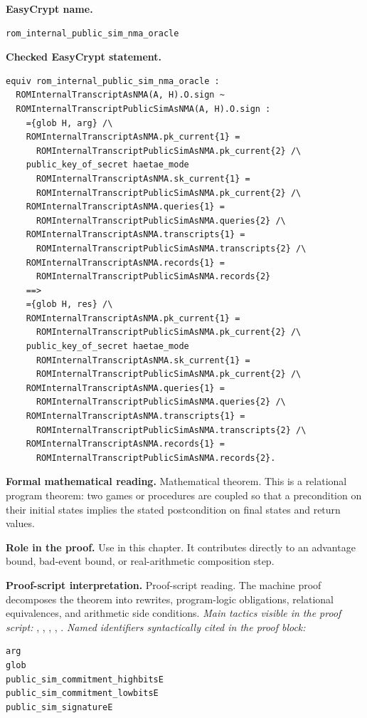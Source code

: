 \begin{formaltheorem}
\noindent\textbf{EasyCrypt name.}
\begin{lstlisting}[language=EasyCrypt,basicstyle=\ttfamily\scriptsize]
rom_internal_public_sim_nma_oracle
\end{lstlisting}
\noindent\textbf{Checked EasyCrypt statement.}
\begin{lstlisting}[language=EasyCrypt,basicstyle=\ttfamily\scriptsize]
equiv rom_internal_public_sim_nma_oracle :
  ROMInternalTranscriptAsNMA(A, H).O.sign ~
  ROMInternalTranscriptPublicSimAsNMA(A, H).O.sign :
    ={glob H, arg} /\
    ROMInternalTranscriptAsNMA.pk_current{1} =
      ROMInternalTranscriptPublicSimAsNMA.pk_current{2} /\
    public_key_of_secret haetae_mode
      ROMInternalTranscriptAsNMA.sk_current{1} =
      ROMInternalTranscriptPublicSimAsNMA.pk_current{2} /\
    ROMInternalTranscriptAsNMA.queries{1} =
      ROMInternalTranscriptPublicSimAsNMA.queries{2} /\
    ROMInternalTranscriptAsNMA.transcripts{1} =
      ROMInternalTranscriptPublicSimAsNMA.transcripts{2} /\
    ROMInternalTranscriptAsNMA.records{1} =
      ROMInternalTranscriptPublicSimAsNMA.records{2}
    ==>
    ={glob H, res} /\
    ROMInternalTranscriptAsNMA.pk_current{1} =
      ROMInternalTranscriptPublicSimAsNMA.pk_current{2} /\
    public_key_of_secret haetae_mode
      ROMInternalTranscriptAsNMA.sk_current{1} =
      ROMInternalTranscriptPublicSimAsNMA.pk_current{2} /\
    ROMInternalTranscriptAsNMA.queries{1} =
      ROMInternalTranscriptPublicSimAsNMA.queries{2} /\
    ROMInternalTranscriptAsNMA.transcripts{1} =
      ROMInternalTranscriptPublicSimAsNMA.transcripts{2} /\
    ROMInternalTranscriptAsNMA.records{1} =
      ROMInternalTranscriptPublicSimAsNMA.records{2}.
\end{lstlisting}
\noindent\textbf{Formal mathematical reading.}
Mathematical theorem. This is a relational program theorem: two games or procedures are coupled so that a precondition on their initial states implies the stated postcondition on final states and return values.

\noindent\textbf{Role in the proof.}
Use in this chapter. It contributes directly to an advantage bound, bad-event bound, or real-arithmetic composition step.

\noindent\textbf{Proof-script interpretation.}
Proof-script reading. The machine proof decomposes the theorem into rewrites, program-logic obligations, relational equivalences, and arithmetic side conditions.
\emph{Main tactics visible in the proof script:} , , , , .
\emph{Named identifiers syntactically cited in the proof block:}
\begin{lstlisting}[language=EasyCrypt,basicstyle=\ttfamily\scriptsize]
arg
glob
public_sim_commitment_highbitsE
public_sim_commitment_lowbitsE
public_sim_signatureE
\end{lstlisting}

\end{formaltheorem}

